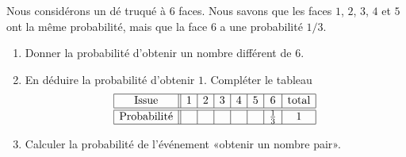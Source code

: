 
\begin{exercice}\label{exosmath-0355}

Nous considérons un dé truqué à \( 6\) faces. Nous savons que les faces \( 1\), \( 2\), \( 3\), \( 4\) et \( 5\) ont la même probabilité, mais que la face \( 6\) a une probabilité \( 1/3\).

\begin{enumerate}
    \item
        Donner la probabilité d'obtenir un nombre différent de \( 6\).       
    \item
        En déduire la probabilité d'obtenir \( 1\). Compléter le tableau
        \begin{equation*}
            \begin{array}[]{|c||c|c|c|c|c|c|c|}
                \hline
                \text{Issue}&1&2&3&4&5&6&\text{total}\\
                \hline\hline
                \text{Probabilité}&&&&&&\frac{1}{ 3 }&1\\
                \hline
            \end{array}
        \end{equation*}
    \item
        Calculer la probabilité de l'événement «obtenir un nombre pair».
\end{enumerate}


\end{exercice}
